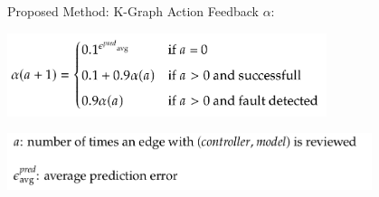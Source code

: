 

\begin{frame}[fragile]{Proposed Method: K-Graph} 
  Action Feedback $\alpha$:\bs

  \includegraphics[width=0.7\textwidth]{figures/proposed_method/successfactor}\pause

  \includegraphics[width=0.8\textwidth]{figures/proposed_method/explain_successf}
\end{frame}

